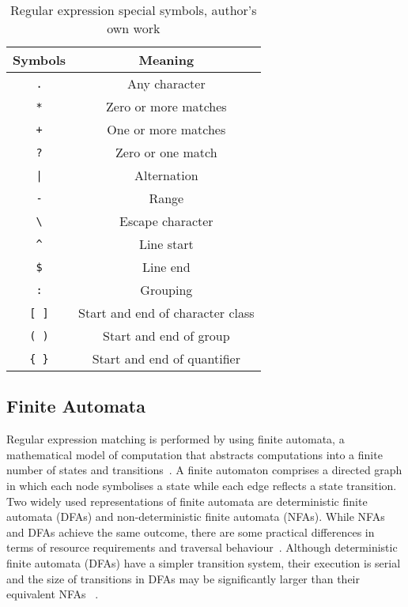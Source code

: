 \documentclass[10pt,onecolumn,twoside,english,a4paper]{article}
\begin{document}
\begin{table}[h!]
	\centering
	\begin{tabular}{ |c|c| }
		\hline
		\textbf{Symbols}        & \textbf{Meaning}                 \\
		\hline
		\texttt{.}              & Any character                    \\
		\hline
		\texttt{*}              & Zero or more matches             \\
		\hline
		\texttt{+}              & One or more matches              \\
		\hline
		\texttt{?}              & Zero or one match                \\
		\hline
		\texttt{|}              & Alternation                      \\
		\hline
		\texttt{-}              & Range                            \\
		\hline
		\texttt{\textbackslash} & Escape character                 \\
		\hline
		\texttt{\^{}}           & Line start                       \\
		\hline
		\texttt{\$}             & Line end                         \\
		\hline
		\texttt{:}              & Grouping                         \\
		\hline
		\texttt{[ ]}            & Start and end of character class \\
		\hline
		\texttt{( )}            & Start and end of group           \\
		\hline
		\texttt{\{ \}}          & Start and end of quantifier      \\
		\hline
	\end{tabular}
	\caption{Regular expression special symbols, author's own work }
	\label{table:regex_special_symbols}
\end{table}

\subsection{Finite Automata} \label{Finite Automata}
Regular expression matching is performed by using finite automata, a mathematical model of computation that abstracts computations into a finite number of states and transitions~\cite{Becchi:regex_large_dataset}. A finite automaton comprises a directed graph in which each node symbolises a state while each edge reflects a state transition.
Two widely used representations of finite automata are deterministic finite automata (DFAs) and non-deterministic finite automata (NFAs). While NFAs and DFAs achieve the same outcome, there are some practical differences in terms of resource requirements and traversal behaviour~\cite{Nourian:DemystifyingFSA}.
Although deterministic finite automata (DFAs) have a simpler transition system, their execution is serial and the size of transitions in DFAs may be significantly larger than their equivalent NFAs ~\cite{Liu:Asynchronous,Liu:WhyGPUSlowNFA}.
\end{document}
